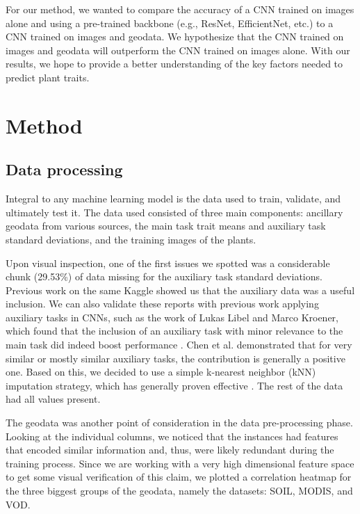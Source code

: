 \documentclass[12pt,a4paper,oneside]{article}
\begin{document}
\smallskip
For our method, we wanted to compare the accuracy of a CNN trained on images alone and using a pre-trained backbone (e.g., ResNet, EfficientNet, etc.) to a CNN trained on images and geodata. We hypothesize that the CNN trained on images and geodata will outperform the CNN trained on images alone. With our results, we hope to provide a better understanding of the key factors needed to predict plant traits.


\section{Method}

\subsection{Data processing}

Integral to any machine learning model is the data used to train, validate, and ultimately test it. The data used consisted of three main components: ancillary geodata from various sources, the main task trait means and auxiliary task standard deviations, and the training images of the plants.

\smallskip 
Upon visual inspection, one of the first issues we spotted was a considerable chunk (29.53\%) of data missing for the auxiliary task standard deviations. Previous work on the same Kaggle showed us that the auxiliary data was a useful inclusion. We can also validate these reports with previous work applying auxiliary tasks in CNNs, such as the work of Lukas Libel and Marco Kroener, which found that the inclusion of an auxiliary task with minor relevance to the main task did indeed boost performance \cite{lukaslibel}. Chen et al. \cite{pmlr-v80-chen18a} demonstrated that for very similar or mostly similar auxiliary tasks, the contribution is generally a positive one. Based on this, we decided to use a simple k-nearest neighbor (kNN) imputation strategy, which has generally proven effective \cite{joel2024performance}. The rest of the data had all values present.

\smallskip
The geodata was another point of consideration in the data pre-processing phase. Looking at the individual columns, we noticed that the instances had features that encoded similar information and, thus, were likely redundant during the training process. Since we are working with a very high dimensional feature space to get some visual verification of this claim, we plotted a correlation heatmap for the three biggest groups of the geodata, namely the datasets: SOIL, MODIS, and VOD.
\end{document}
